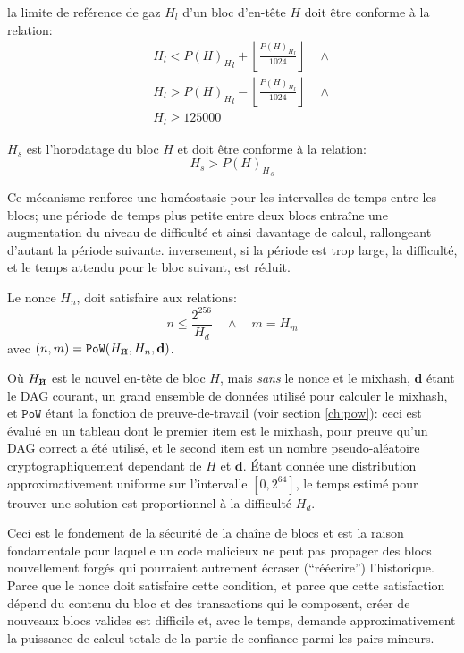 \documentclass[9pt,oneside]{amsart}
\newcommand{\hcancel}[1]{%
    \tikz[baseline=(tocancel.base)]{
        \node[inner sep=0pt,outer sep=0pt] (tocancel) {#1};
        \draw[black] (tocancel.south west) -- (tocancel.north east);
    }%
}%
\begin{document}
\begin{multicols}{2}
la limite de reférence de gaz $H_l$ d'un bloc d'en-tête $H$ doit être conforme à la relation:
\begin{eqnarray}
& & H_l < {P(H)_H}_l + \left\lfloor\frac{{P(H)_H}_l}{1024}\right\rfloor \quad \wedge \\
& & H_l > {P(H)_H}_l - \left\lfloor\frac{{P(H)_H}_l}{1024}\right\rfloor \quad \wedge \\
& & H_l \geqslant 125000
\end{eqnarray}

$H_s$ est l'horodatage du bloc $H$ et doit être conforme à la relation:
\begin{equation}
H_s > {P(H)_H}_s
\end{equation}

Ce mécanisme renforce une homéostasie pour les intervalles de temps entre les blocs; une période de temps plus petite entre deux blocs entraîne une augmentation du niveau de difficulté et ainsi davantage de calcul, rallongeant d'autant la période suivante. inversement, si la période est trop large, la difficulté, et le temps attendu pour le bloc suivant, est réduit.

Le nonce $H_n$, doit satisfaire aux relations:
\begin{equation}
n \leqslant \frac{2^{256}}{H_d} \quad \wedge \quad m = H_m
\end{equation}
avec $(n, m) = \mathtt{PoW}(H_{\hcancel{n}}, H_n, \mathbf{d})$.

Où $H_{\hcancel{n}}$ est le nouvel en-tête de bloc $H$, mais \textit{sans} le nonce et le mixhash, $\mathbf{d}$ étant le DAG courant, un grand ensemble de données utilisé pour calculer le mixhash, et $\mathtt{PoW}$ étant la fonction de preuve-de-travail (voir section \ref{ch:pow}): ceci est évalué en un tableau dont le premier item est le mixhash, pour preuve qu'un DAG correct a été utilisé, et le second item est un nombre pseudo-aléatoire cryptographiquement dependant de $H$ et $\mathbf{d}$. Étant donnée une distribution approximativement uniforme sur l'intervalle $[0, 2^{64}]$, le temps estimé pour trouver une solution est proportionnel à la difficulté $H_d$.

Ceci est le fondement de la sécurité de la chaîne de blocs et est la raison fondamentale pour laquelle un code malicieux ne peut pas propager des blocs nouvellement forgés qui pourraient autrement écraser (``réécrire'') l'historique. Parce que le nonce doit satisfaire cette condition, et parce que cette satisfaction dépend du contenu du bloc et des transactions qui le composent, créer de nouveaux blocs valides est difficile et, avec le temps, demande  approximativement la puissance de calcul totale de la partie de confiance parmi les pairs mineurs.


\end{multicols}
\end{document}

